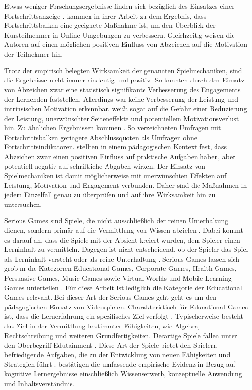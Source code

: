 \documentclass[
    a4paper,
    doc,
    12pt,
    natbib,
]{apa6}
\begin{document}
Etwas weniger Forschungsergebnisse finden sich bezüglich des Einsatzes einer Fortschrittsanzeige \citep{koivisto_rise_2019}.
\cite{olsson_visualisation_2016} kommen in ihrer Arbeit zu dem Ergebnis, dass Fortschrittsbalken eine geeignete Maßnahme ist, um den Überblick der Kursteilnehmer in Online-Umgebungen zu verbessern. Gleichzeitig weisen die Autoren auf einen möglichen positiven Einfluss von Abzeichen auf die Motivation der Teilnehmer hin.

Trotz der empirisch belegten Wirksamkeit der genannten Spielmechaniken, sind die Ergebnisse nicht immer eindeutig und positiv.
So konnten \cite{ortiz_gamification_2017} durch den Einsatz von Abzeichen zwar eine statistisch signifikante Verbesserung des Engagements der Lernenden feststellen.
Allerdings war keine Verbesserung der Leistung und intrinsischen Motivation erkennbar.
\cite{toda_dark_2018} weißt sogar auf die Gefahr einer Reduzierung der Leistung, unerwünschter Seiteneffekte und potentiellem Motivationsverlust hin.
Zu ähnlichen Ergebnissen kommen \cite{liu_examining_2017}.
So verzeichneten Umfragen mit Fortschrittsbalken geringere Abschlussquoten als Umfragen ohne Fortschrittsindikatoren. \cite{dominguez_gamifying_2013} stellten in einem pädagogischen Kontext fest, dass Abzeichen zwar einen positiven Einfluss auf praktische Aufgaben haben, aber potentiell negativ auf schriftliche Abgaben wirken. Der Einsatz von Spielmechaniken ist damit möglicherweise mit unerwünschten Effekten auf Leistung, Motivation und Engagement verbunden. Daher sind die Maßnahmen in jedem Einzelfall genau zu überprüfen und auf ihre Wirksamkeit hin zu untersuchen.

Serious Games sind Spiele, die nicht ausschließlich der reinen Unterhaltung dienen, sondern primär auf die Vermittlung von Wissen abzielen \citep[S.17]{michael_serious_2005}.
Dabei kommt es darauf an, dass die Spiele mit der Absicht kreiert wurden, dem Spieler einen Lerninhalt zu vermitteln.
Dagegen ist nicht entscheidend, ob der Spieler das Spiel als Lerninhalt versteht oder als reine Unterhaltung \citep[S.3]{bopp_serious_2009}.
Serious Games lassen sich grob in die Kategorien Educational  Games, 
Corporate  Games,  Health  Games,  Persuasive  Games,  Music  Games  sowie  Virtual  Worlds  und 
Mobile Learning Games unterteilen \citep[S.4]{bopp_serious_2009}.
Für diese Arbeit ist lediglich die Kategorie der Educational  Games relevant.
Bei dieser Art der Serious Games geht geht es um den pädagogischen Einsatz von Videospielen.
Charakteristisch für Educational  Games ist, dass die Lernerfahrung ein spezifisches Ziel verfolgt \citep{egenfeldt-nielsen_overview_2006, bopp_serious_2009}.
Typischerweise besteht das Ziel in der Vermittlung bestimmter Fähigkeiten, wie Algebra, Rechtschreibung und weiteren Grundfertigkeiten.
Derartige Spiele fallen unter den Oberbegriff Edutainment \citep{egenfeldt-nielsen_overview_2006}.
Diese Art der Spiele bietet den Spielern befriedigende Aufgaben, die zu der Entwicklung von neuen Fähigkeiten und Strategien führt \citep{stapleton_serious_2004}.
\cite{vlachopoulos_effect_2017} bestätigen die umfassende empirische Evidenz in Bezug auf kognitive Lernergebnisse einschließlich Wissenserwerb, konzeptuelle Anwendung und Inhaltsverständnis.
\end{document}
